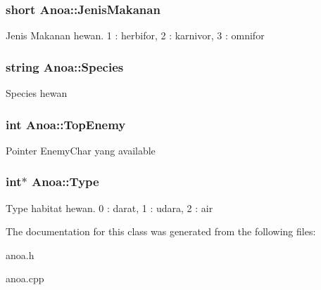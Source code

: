 \subsubsection[{\texorpdfstring{Jenis\+Makanan}{JenisMakanan}}]{\setlength{\rightskip}{0pt plus 5cm}short Anoa\+::\+Jenis\+Makanan\hspace{0.3cm}{\ttfamily [protected]}}\hypertarget{class_anoa_af710bb7dedfd5ea717db3c940981d3e9}{}\label{class_anoa_af710bb7dedfd5ea717db3c940981d3e9}
Jenis Makanan hewan. 1 \+: herbifor, 2 \+: karnivor, 3 \+: omnifor 
\subsubsection[{\texorpdfstring{Species}{Species}}]{\setlength{\rightskip}{0pt plus 5cm}string Anoa\+::\+Species\hspace{0.3cm}{\ttfamily [protected]}}\hypertarget{class_anoa_a6dffd5df83dbf71071233b6c32aac878}{}\label{class_anoa_a6dffd5df83dbf71071233b6c32aac878}
Species hewan 
\subsubsection[{\texorpdfstring{Top\+Enemy}{TopEnemy}}]{\setlength{\rightskip}{0pt plus 5cm}int Anoa\+::\+Top\+Enemy\hspace{0.3cm}{\ttfamily [protected]}}\hypertarget{class_anoa_ae36a4e73eaeed7952baf5804ea68cdc2}{}\label{class_anoa_ae36a4e73eaeed7952baf5804ea68cdc2}
Pointer Enemy\+Char yang available 
\subsubsection[{\texorpdfstring{Type}{Type}}]{\setlength{\rightskip}{0pt plus 5cm}int$\ast$ Anoa\+::\+Type\hspace{0.3cm}{\ttfamily [protected]}}\hypertarget{class_anoa_a074ddc510aa6b04d78100f1d9d562f2e}{}\label{class_anoa_a074ddc510aa6b04d78100f1d9d562f2e}
Type habitat hewan. 0 \+: darat, 1 \+: udara, 2 \+: air 

The documentation for this class was generated from the following files\+:\begin{DoxyCompactItemize}
\item 
anoa.\+h\item 
anoa.\+cpp\end{DoxyCompactItemize}

